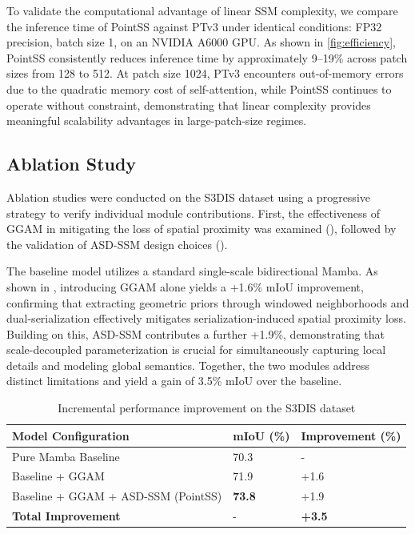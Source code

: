 \documentclass[a4paper,fleqn]{cas-dc}
\begin{document}
To validate the computational advantage of linear SSM complexity, we compare the inference time of PointSS against PTv3 under identical conditions: FP32 precision, batch size 1, on an NVIDIA A6000 GPU. As shown in \cref{fig:efficiency}, PointSS consistently reduces inference time by approximately 9--19\% across patch sizes from 128 to 512. At patch size 1024, PTv3 encounters out-of-memory errors due to the quadratic memory cost of self-attention, while PointSS continues to operate without constraint, demonstrating that linear complexity provides meaningful scalability advantages in large-patch-size regimes.

\subsection{Ablation Study}

Ablation studies were conducted on the S3DIS dataset using a progressive strategy to verify individual module contributions. First, the effectiveness of GGAM in mitigating the loss of spatial proximity was examined (), followed by the validation of ASD-SSM design choices ().

The baseline model utilizes a standard single-scale bidirectional Mamba. As shown in , introducing GGAM alone yields a +1.6\% mIoU improvement, confirming that extracting geometric priors through windowed neighborhoods and dual-serialization effectively mitigates serialization-induced spatial proximity loss. Building on this, ASD-SSM contributes a further +1.9\%, demonstrating that scale-decoupled parameterization is crucial for simultaneously capturing local details and modeling global semantics. Together, the two modules address distinct limitations and yield a gain of 3.5\% mIoU over the baseline.

\begin{table}[!t]
\centering
\caption{Incremental performance improvement on the S3DIS dataset}
\label{tab:progressive_improvement}
\begin{tabular}{lll}
\toprule
\textbf{Model Configuration} & \textbf{mIoU (\%)} & \textbf{Improvement (\%)} \\
\midrule
Pure Mamba Baseline & 70.3 & - \\
Baseline + GGAM & 71.9 & +1.6 \\
Baseline + GGAM + ASD-SSM (PointSS) & \textbf{73.8} & +1.9 \\
\midrule
\textbf{Total Improvement} & - & \textbf{+3.5} \\
\bottomrule
\end{tabular}
\end{table}
\end{document}

